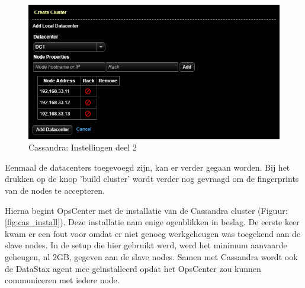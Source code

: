 \begin{figure}[H]
  	\centering
    \includegraphics[width=1.0\textwidth]{img/4_installatie_cassandra/1_Configuration_part_2}
    \caption{Cassandra: Instellingen deel 2}
    \label{fig:cas_conf_2}
\end{figure}

Eenmaal de datacenters toegevoegd zijn, kan er verder gegaan worden.
Bij het drukken op de knop 'build cluster' wordt verder nog gevraagd om de fingerprints van de nodes te accepteren.

Hierna begint OpsCenter met de installatie van de Cassandra cluster (Figuur: \ref{fig:cas_install}).
Deze installatie nam enige ogenblikken in beslag.
De eerste keer kwam er een fout voor omdat er niet genoeg werkgeheugen was toegekend aan de slave nodes.
In de setup die hier gebruikt werd, werd het minimum aanvaarde geheugen, nl 2GB, gegeven aan de slave nodes.
Samen met Cassandra wordt ook de DataStax agent mee geïnstalleerd opdat het OpsCenter zou kunnen communiceren met iedere node.

